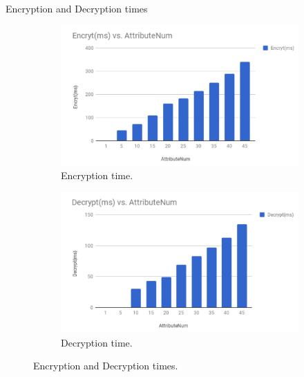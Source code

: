 \documentclass[11pt]{beamer}
\begin{document}
\begin{frame}{Encryption and Decryption times}

\begin{figure}
	\begin{subfigure}{.5\textwidth}
		\centering
		\includegraphics[scale=0.17]{encrypttime.png}
		\caption{Encryption time.}
		\label{fig:encrypttime}
	\end{subfigure}%
	\begin{subfigure}{.5\textwidth}
		\centering
		\includegraphics[scale=0.17]{decrypttime.png}	
		\caption{Decryption time.}
		\label{fig:decrypttime}
	\end{subfigure}
	\caption{Encryption and Decryption times.}
\end{figure}

\end{frame}
\end{document}
